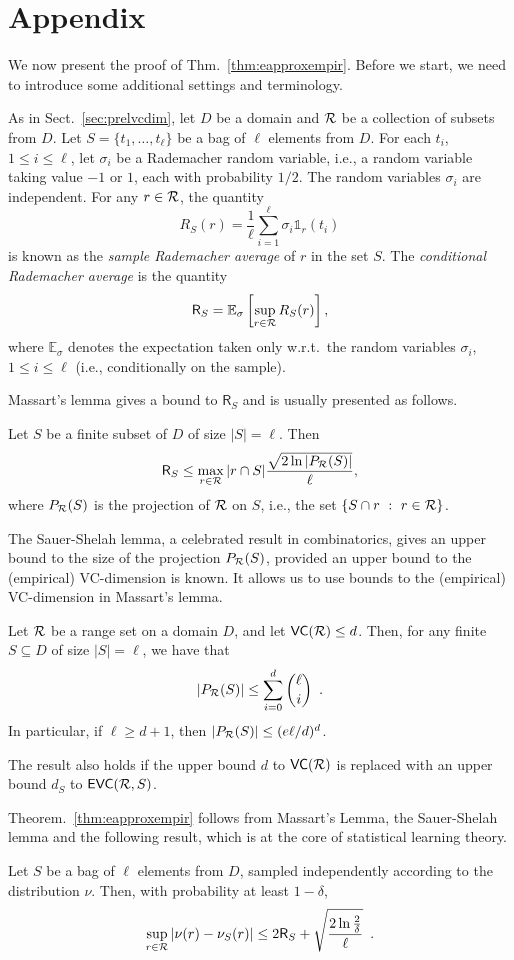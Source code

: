 \appendix
\section{Appendix}
We now present the proof of Thm.~\ref{thm:eapproxempir}. Before we start, we
need to introduce some additional settings and terminology.

As in Sect.~\ref{sec:prelvcdim}, let $D$ be a domain and $\mathcal{R}$ be a
collection of subsets from $D$. Let $S=\{t_1,\dotsc,t_\ell\}$ be a bag of $\ell$
elements from $D$. For each $t_i$, $1\le i\le \ell$, let $\sigma_i$ be a
Rademacher random variable, i.e., a random variable taking value $-1$ or $1$,
each with probability $1/2$. The random variables $\sigma_i$ are independent.
For any $r\in\mathcal{R}$, the quantity
\[
	R_S(r)=\frac{1}{\ell}\sum_{i=1}^\ell \sigma_i\mathds{1}_r(t_i)
\]
is known as the \emph{sample Rademacher average} of $r$ in the set $S$. The
\emph{conditional Rademacher average} is the quantity
\[
	\mathsf{R}_S=\mathbb{E}_\sigma\left[\sup_{r\in\mathcal{R}}R_S(r)\right],
\]
where $\mathbb{E}_\sigma$ denotes the expectation taken only w.r.t.~the random
variables $\sigma_i$, $1\le i\le\ell$ (i.e., conditionally on the sample).

Massart's lemma gives a bound to $\mathsf{R}_S$ and is usually presented as follows.
\begin{lemma}\label{lem:massart}
	Let $S$ be a finite subset of $D$ of size $|S|=\ell$. Then
	\[
		\mathsf{R}_S\le\max_{r\in\mathcal{R}}|r\cap S|\frac{\sqrt{2\ln
		|P_{\mathcal{R}}(S)|}}{\ell},
	\]
	where $P_{\mathcal{R}}(S)$ is the projection of $\mathcal{R}$ on $S$, i.e., the set
	$\{S\cap r ~:~ r\in\mathcal{R}\}$.
\end{lemma}

The Sauer-Shelah lemma, a celebrated result in combinatorics, gives an upper
bound to the size of the projection $P_{\mathcal{R}}(S)$, provided an upper bound to
the (empirical) VC-dimension is known. It allows us to use bounds to the
(empirical) VC-dimension in Massart's lemma.

\begin{lemma}\label{lem:sauer}
	Let $\mathcal{R}$ be a range set on a domain $D$, and let $\mathsf{VC}(\mathcal{R})\le d$.
	Then, for any finite $S\subseteq D$ of size $|S|=\ell$, we have that
	\[
		|P_{\mathcal{R}}(S)|\le \sum_{i=0}^d\binom{\ell}{i}\enspace.
	\]
	In particular, if $\ell\ge d+1$, then $|P_{\mathcal{R}}(S)|\le (e\ell/d)^d$.

	The result also holds if the upper bound $d$ to $\mathsf{VC}(\mathcal{R})$ is replaced with
	an upper bound $d_S$ to $\mathsf{EVC}(\mathcal{R},S)$.
\end{lemma}

Theorem.~\ref{thm:eapproxempir} follows from Massart's Lemma, the Sauer-Shelah
lemma and the following result, which is at the core of statistical learning
theory.

\begin{theorem}
	Let $S$ be a bag of $\ell$ elements from $D$, sampled independently
	according to the distribution $\nu$.  Then, with probability at least
	$1-\delta$,
	\[
		\sup_{r\in\mathcal{R}}|\nu(r)-\nu_S(r)|\le 2 \mathsf{R}_S
		+\sqrt{\frac{2\ln\frac{2}{\delta}}{\ell}}\enspace.
	\]
\end{theorem}
